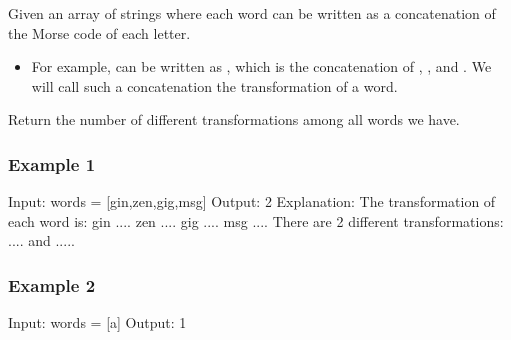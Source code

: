 \documentclass[letterpaper,12pt,english]{book}
\begin{document}
\sphinxAtStartPar
Given an array of strings  where each word can be written as a concatenation of the Morse code of each letter.
\begin{itemize}
\item {} 
\sphinxAtStartPar
For example,  can be written as , which is the concatenation of , , and . We will call such a concatenation the transformation of a word.

\end{itemize}

\sphinxAtStartPar
Return the number of different transformations among all words we have.


\subsubsection{Example 1}
\label{\detokenize{String/08_STR_804_Unique_Morse_Code_Words:example-1}}
\begin{sphinxVerbatim}[commandchars=\\\{\}]
Input: words = [\PYGZdq{}gin\PYGZdq{},\PYGZdq{}zen\PYGZdq{},\PYGZdq{}gig\PYGZdq{},\PYGZdq{}msg\PYGZdq{}]
Output: 2
Explanation: The transformation of each word is:
\PYGZdq{}gin\PYGZdq{} \PYGZhy{}\PYGZgt{} \PYGZdq{}\PYGZhy{}\PYGZhy{}...\PYGZhy{}.\PYGZdq{}
\PYGZdq{}zen\PYGZdq{} \PYGZhy{}\PYGZgt{} \PYGZdq{}\PYGZhy{}\PYGZhy{}...\PYGZhy{}.\PYGZdq{}
\PYGZdq{}gig\PYGZdq{} \PYGZhy{}\PYGZgt{} \PYGZdq{}\PYGZhy{}\PYGZhy{}...\PYGZhy{}\PYGZhy{}.\PYGZdq{}
\PYGZdq{}msg\PYGZdq{} \PYGZhy{}\PYGZgt{} \PYGZdq{}\PYGZhy{}\PYGZhy{}...\PYGZhy{}\PYGZhy{}.\PYGZdq{}
There are 2 different transformations: \PYGZdq{}\PYGZhy{}\PYGZhy{}...\PYGZhy{}.\PYGZdq{} and \PYGZdq{}\PYGZhy{}\PYGZhy{}...\PYGZhy{}\PYGZhy{}.\PYGZdq{}.
\end{sphinxVerbatim}


\subsubsection{Example 2}
\label{\detokenize{String/08_STR_804_Unique_Morse_Code_Words:example-2}}
\begin{sphinxVerbatim}[commandchars=\\\{\}]
Input: words = [\PYGZdq{}a\PYGZdq{}]
Output: 1
\end{sphinxVerbatim}
\end{document}

